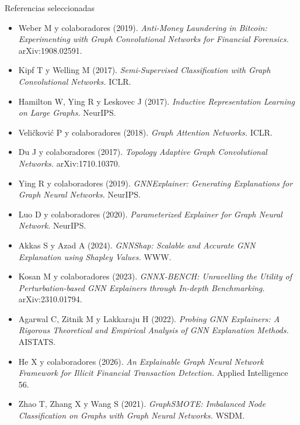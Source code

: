 \documentclass[aspectratio=169,11pt]{beamer}
\begin{document}
\appendix

\begin{frame}[allowframebreaks]{Referencias seleccionadas}
\scriptsize
\begin{itemize}
  \item Weber M y colaboradores (2019). \emph{Anti-Money Laundering in Bitcoin: Experimenting with Graph Convolutional Networks for Financial Forensics.} arXiv:1908.02591.
  \item Kipf T y Welling M (2017). \emph{Semi-Supervised Classification with Graph Convolutional Networks.} ICLR.
  \item Hamilton W, Ying R y Leskovec J (2017). \emph{Inductive Representation Learning on Large Graphs.} NeurIPS.
  \item Veličković P y colaboradores (2018). \emph{Graph Attention Networks.} ICLR.
  \item Du J y colaboradores (2017). \emph{Topology Adaptive Graph Convolutional Networks.} arXiv:1710.10370.
  \item Ying R y colaboradores (2019). \emph{GNNExplainer: Generating Explanations for Graph Neural Networks.} NeurIPS.
  \item Luo D y colaboradores (2020). \emph{Parameterized Explainer for Graph Neural Network.} NeurIPS.
  \item Akkas S y Azad A (2024). \emph{GNNShap: Scalable and Accurate GNN Explanation using Shapley Values.} WWW.
  \item Kosan M y colaboradores (2023). \emph{GNNX-BENCH: Unravelling the Utility of Perturbation-based GNN Explainers through In-depth Benchmarking.} arXiv:2310.01794.
  \item Agarwal C, Zitnik M y Lakkaraju H (2022). \emph{Probing GNN Explainers: A Rigorous Theoretical and Empirical Analysis of GNN Explanation Methods.} AISTATS.
  \item He X y colaboradores (2026). \emph{An Explainable Graph Neural Network Framework for Illicit Financial Transaction Detection.} Applied Intelligence 56.
  \item Zhao T, Zhang X y Wang S (2021). \emph{GraphSMOTE: Imbalanced Node Classification on Graphs with Graph Neural Networks.} WSDM.
\end{itemize}
\end{frame}
\end{document}
